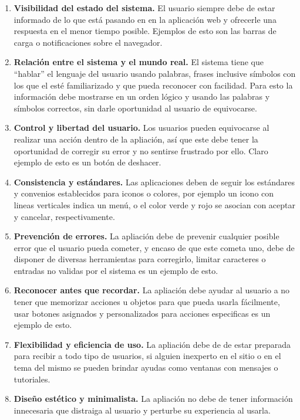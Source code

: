 \begin{enumerate}
	\item \textbf{Visibilidad del estado del sistema.} El usuario siempre debe de estar informado de lo que está pasando en en la aplicación web y ofrecerle una respuesta en el menor tiempo posible. Ejemplos de esto son las barras de carga o notificaciones sobre el navegador.
	
	\item \textbf{Relación entre el sistema y el mundo real.} El sistema tiene que “hablar” el lenguaje del usuario usando palabras, frases inclusive símbolos con los que el esté familiarizado y que pueda reconocer con facilidad. Para esto la información debe mostrarse en un orden lógico y usando las palabras y símbolos correctos, sin darle oportunidad al usuario de equivocarse.
	\item \textbf{Control y libertad del usuario.} Los usuarios pueden equivocarse al realizar una acción dentro de la apliación, así que este debe tener la oportunidad de corregir su error y no sentirse frustrado por ello. Claro ejemplo de esto es un botón de deshacer.
	
	\item \textbf{Consistencia y estándares.} Las aplicaciones deben de seguir los estándares y convenios establecidos para iconos o colores, por ejemplo un icono con lineas verticales indica un menú, o el color verde y rojo se asocian con aceptar y cancelar, respectivamente.
	
	\item \textbf{Prevención de errores.} La apliación debe de prevenir cualquier posible error que el usuario pueda cometer, y encaso de que este cometa uno, debe de disponer de diversas herramientas para corregirlo, limitar caracteres o entradas no validas por el sistema es un ejemplo de esto.
	
	\item \textbf{Reconocer antes que recordar.} La apliación debe ayudar al usuario a no tener que memorizar acciones u objetos para que pueda usarla fácilmente, usar botones asignados y personalizados para acciones especificas es un ejemplo de esto.
	
	\item \textbf{Flexibilidad y eficiencia de uso.} La apliación debe de de estar preparada para recibir a todo tipo de usuarios, si alguien inexperto en el sitio o en el tema del mismo se pueden brindar ayudas como ventanas con mensajes o tutoriales. 
	
	\item \textbf{Diseño estético y minimalista.} La apliación no debe de tener información innecesaria que distraiga al usuario y perturbe su experiencia al usarla.
	

\end{enumerate}
